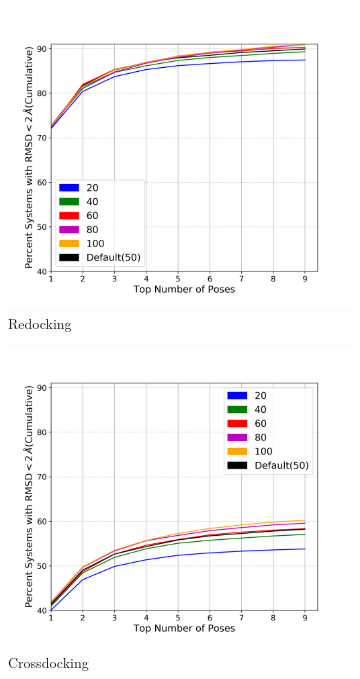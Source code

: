 \documentclass[journal=jcisd8,manuscript=article]{achemso}
\begin{document}
\begin{figure}    
        \begin{subfigure}[b]{0.48\textwidth}    
		\centering
		\includegraphics[width=\textwidth]{figures/redocking/sweep_mcsaved_line.png}
		\caption{Redocking}
		\label{fig:mcsaved rd}
        \end{subfigure}    
        \begin{subfigure}[b]{0.48\textwidth}    
		\centering
		\includegraphics[width=\textwidth]{figures/crossdocking/sweep_mcsaved_line.png}
		\caption{Crossdocking}
		\label{fig:mcsaved cd}
        \end{subfigure}    
	\caption{}
	\label{fig:mcsaved}
\end{figure}    
\end{document}
